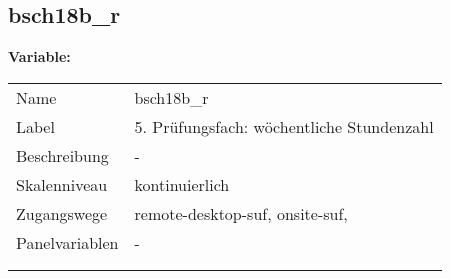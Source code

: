 	
	
	\subsection{bsch18b\_r}
	\label{subSection:bsch18b_r}

	\noindent\textbf{Variable:}\\
		\begin{tabular}{lL{11.3cm}}
			\label{tableVariable:bsch18b_r}
			Name & bsch18b\_r \\
			Label & 5. Prüfungsfach: wöchentliche Stundenzahl \\
			Beschreibung & - \\
			Skalenniveau & kontinuierlich \\
			Zugangswege &
				remote-desktop-suf,
				onsite-suf,
 \\
			Panelvariablen & -
			 \\
			 \\
 \\
		\end{tabular}





